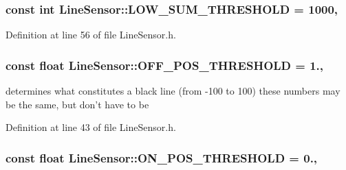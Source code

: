 \hypertarget{classLineSensor_a929091ad1746a0a337c2259ba79c959a}{
\subsubsection[{L\-O\-W\-\_\-\-S\-U\-M\-\_\-\-T\-H\-R\-E\-S\-H\-O\-L\-D}]{\setlength{\rightskip}{0pt plus 5cm}const int Line\-Sensor\-::\-L\-O\-W\-\_\-\-S\-U\-M\-\_\-\-T\-H\-R\-E\-S\-H\-O\-L\-D = 1000\hspace{0.3cm}{\ttfamily [static]}, {\ttfamily [private]}}}\label{classLineSensor_a929091ad1746a0a337c2259ba79c959a}


Definition at line 56 of file Line\-Sensor.\-h.

\hypertarget{classLineSensor_a8db50f7d2c026003180d0c5c7e184d9f}{
\subsubsection[{O\-F\-F\-\_\-\-P\-O\-S\-\_\-\-T\-H\-R\-E\-S\-H\-O\-L\-D}]{\setlength{\rightskip}{0pt plus 5cm}const float Line\-Sensor\-::\-O\-F\-F\-\_\-\-P\-O\-S\-\_\-\-T\-H\-R\-E\-S\-H\-O\-L\-D = 1.\hspace{0.3cm}{\ttfamily [static]}, {\ttfamily [private]}}}\label{classLineSensor_a8db50f7d2c026003180d0c5c7e184d9f}


determines what constitutes a black line (from -\/100 to 100) these numbers may be the same, but don't have to be 



Definition at line 43 of file Line\-Sensor.\-h.

\hypertarget{classLineSensor_a3e3c5f134159562e56fcd06e55cc7024}{
\subsubsection[{O\-N\-\_\-\-P\-O\-S\-\_\-\-T\-H\-R\-E\-S\-H\-O\-L\-D}]{\setlength{\rightskip}{0pt plus 5cm}const float Line\-Sensor\-::\-O\-N\-\_\-\-P\-O\-S\-\_\-\-T\-H\-R\-E\-S\-H\-O\-L\-D = 0.\hspace{0.3cm}{\ttfamily [static]}, {\ttfamily [private]}}}\label{classLineSensor_a3e3c5f134159562e56fcd06e55cc7024}


